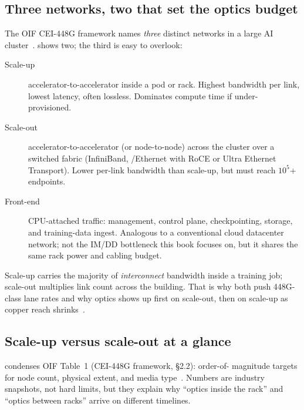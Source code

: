 \subsection{Three networks, two that set the optics budget}

The OIF CEI-448G framework names \emph{three} distinct networks in a large AI
cluster~.  shows two; the third is easy to
overlook:

\begin{description}
\item[Scale-up] accelerator-to-accelerator inside a pod or rack. Highest bandwidth
      per link, lowest latency, often lossless. Dominates compute time if under-
      provisioned.
\item[Scale-out] accelerator-to-accelerator (or node-to-node) across the cluster
      over a switched fabric (InfiniBand, /Ethernet with
      RoCE or Ultra Ethernet Transport). Lower per-link bandwidth than scale-up,
      but must reach $10^5$+ endpoints.
\item[Front-end] CPU-attached traffic: management, control plane, checkpointing,
      storage, and training-data ingest. Analogous to a conventional cloud
      datacenter network; not the IM/DD bottleneck this book focuses on, but it
      shares the same rack power and cabling budget.
\end{description}

Scale-up carries the majority of \emph{interconnect} bandwidth inside a training
job; scale-out multiplies link count across the building. That is why both push
448G-class lane rates and why optics shows up first on scale-out, then on
scale-up as copper reach shrinks~.

\subsection{Scale-up versus scale-out at a glance}

 condenses OIF Table~1 (CEI-448G framework, \S2.2): order-of-
magnitude targets for node count, physical extent, and media type~.
Numbers are industry snapshots, not hard limits, but they explain why ``optics
inside the rack'' and ``optics between racks'' arrive on different timelines.

